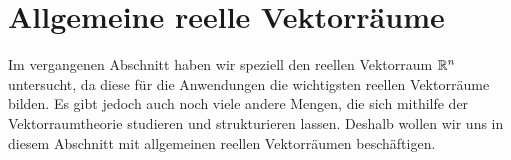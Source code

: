 \newpage

\section{Allgemeine reelle Vektorräume}\label{section_vr_reell}

\setcounter{definition}{0}
\setcounter{beispiel}{0}
\setcounter{notiz}{0}

Im vergangenen Abschnitt haben wir speziell den reellen Vektorraum $\mathbb R^n$ untersucht, da diese 
für die Anwendungen die wichtigsten reellen Vektorräume bilden. Es gibt jedoch auch noch 
viele andere Mengen, die sich mithilfe der Vektorraumtheorie studieren und strukturieren lassen. 
Deshalb wollen wir uns in diesem Abschnitt mit allgemeinen reellen Vektorräumen beschäftigen. 

%
%
%
